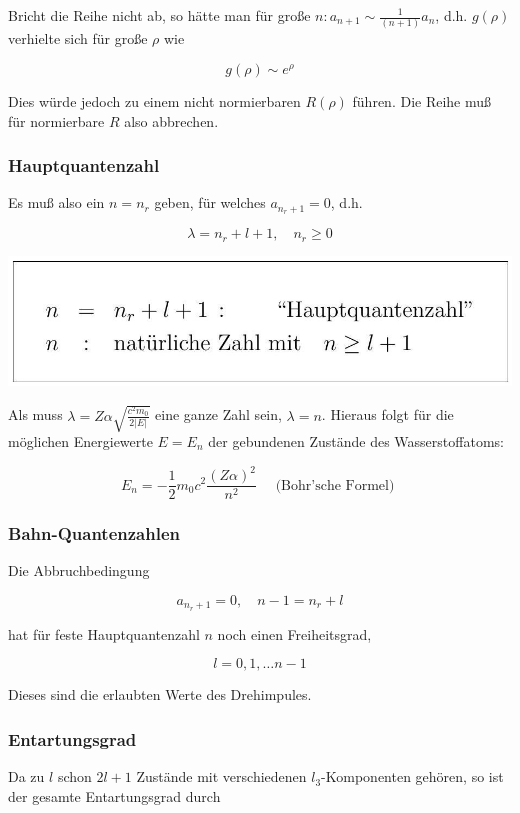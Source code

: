\documentclass[10pt, letterpaper]{article}
\begin{document}
Bricht die Reihe nicht ab, so hätte man für große $n: a_{n+1} \sim \frac{1}{(n+1)} a_{n}$, d.h. $g(\rho)$ verhielte sich für große $\rho$ wie

$$
g(\rho) \sim e^{\rho}
$$

Dies würde jedoch zu einem nicht normierbaren $R(\rho)$ führen. Die Reihe muß für normierbare $R$ also abbrechen.

\subsubsection*{Hauptquantenzahl}
Es muß also ein $n=n_{r}$ geben, für welches $a_{n_{r}+1}=0$, d.h.

$$
\lambda=n_{r}+l+1, \quad n_{r} \geq 0
$$

\begin{center}
\includegraphics[scale=0.2]{2025_05_21_d5590f158a899e385c7cg-05}
\end{center}

Als muss $\lambda=Z \alpha \sqrt{\frac{c^{2} m_{0}}{2|E|}}$ eine ganze Zahl sein, $\lambda=n$. Hieraus folgt für die möglichen Energiewerte $E=E_{n}$ der gebundenen Zustände des Wasserstoffatoms:

$$
E_{n}=-\frac{1}{2} m_{0} c^{2} \frac{(Z \alpha)^{2}}{n^{2}} \quad \text { (Bohr'sche Formel) }
$$

\subsubsection*{Bahn-Quantenzahlen}
Die Abbruchbedingung

$$
a_{n_{r}+1}=0, \quad n-1=n_{r}+l
$$

hat für feste Hauptquantenzahl $n$ noch einen Freiheitsgrad,

$$
l=0,1, \ldots n-1
$$

Dieses sind die erlaubten Werte des Drehimpules.

\subsubsection*{Entartungsgrad}
Da zu $l$ schon $2 l+1$ Zustände mit verschiedenen $l_{3}$-Komponenten gehören, so ist der gesamte Entartungsgrad durch
\end{document}
